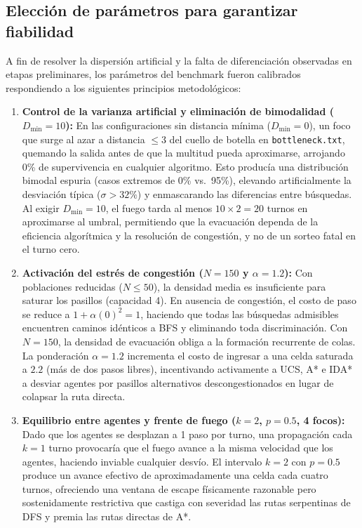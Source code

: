 \documentclass[11pt,letterpaper]{article}
\begin{document}
\subsection{Elección de parámetros para garantizar fiabilidad}
A fin de resolver la dispersión artificial y la falta de diferenciación observadas en etapas preliminares, los parámetros del benchmark fueron calibrados respondiendo a los siguientes principios metodológicos:

\begin{enumerate}
    \item \textbf{Control de la varianza artificial y eliminación de bimodalidad ($D_{\min} = 10$):}
    En las configuraciones sin distancia mínima ($D_{\min}=0$), un foco que surge al azar a distancia $\le 3$ del cuello de botella en \texttt{bottleneck.txt}, quemando la salida antes de que la multitud pueda aproximarse, arrojando 0\% de supervivencia en cualquier algoritmo. Esto producía una distribución bimodal espuria (casos extremos de 0\% vs.\ 95\%), elevando artificialmente la desviación típica ($\sigma > 32\%$) y enmascarando las diferencias entre búsquedas. Al exigir $D_{\min} = 10$, el fuego tarda al menos $10 \times 2 = 20$ turnos en aproximarse al umbral, permitiendo que la evacuación dependa de la eficiencia algorítmica y la resolución de congestión, y no de un sorteo fatal en el turno cero.

    \item \textbf{Activación del estrés de congestión ($N = 150$ y $\alpha = 1.2$):}
    Con poblaciones reducidas ($N \le 50$), la densidad media es insuficiente para saturar los pasillos (capacidad 4). En ausencia de congestión, el costo de paso se reduce a $1 + \alpha(0)^2 = 1$, haciendo que todas las búsquedas admisibles encuentren caminos idénticos a BFS y eliminando toda discriminación. Con $N=150$, la densidad de evacuación obliga a la formación recurrente de colas. La ponderación $\alpha = 1.2$ incrementa el costo de ingresar a una celda saturada a $2.2$ (más de dos pasos libres), incentivando activamente a UCS, A* e IDA* a desviar agentes por pasillos alternativos descongestionados en lugar de colapsar la ruta directa.

    \item \textbf{Equilibrio entre agentes y frente de fuego ($k = 2$, $p = 0.5$, 4 focos):}
    Dado que los agentes se desplazan a 1 paso por turno, una propagación cada $k=1$ turno provocaría que el fuego avance a la misma velocidad que los agentes, haciendo inviable cualquier desvío. El intervalo $k=2$ con $p=0.5$ produce un avance efectivo de aproximadamente una celda cada cuatro turnos, ofreciendo una ventana de escape físicamente razonable pero sostenidamente restrictiva que castiga con severidad las rutas serpentinas de DFS y premia las rutas directas de A*.


\end{enumerate}
\end{document}
